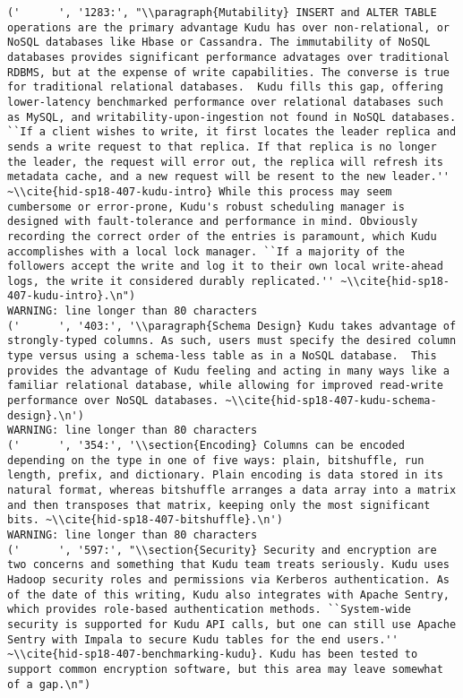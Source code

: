 \begin{tiny}
\begin{verbatim}
('      ', '1283:', "\\paragraph{Mutability} INSERT and ALTER TABLE operations are the primary advantage Kudu has over non-relational, or NoSQL databases like Hbase or Cassandra. The immutability of NoSQL databases provides significant performance advatages over traditional RDBMS, but at the expense of write capabilities. The converse is true for traditional relational databases.  Kudu fills this gap, offering lower-latency benchmarked performance over relational databases such as MySQL, and writability-upon-ingestion not found in NoSQL databases. ``If a client wishes to write, it first locates the leader replica and sends a write request to that replica. If that replica is no longer the leader, the request will error out, the replica will refresh its metadata cache, and a new request will be resent to the new leader.'' ~\\cite{hid-sp18-407-kudu-intro} While this process may seem cumbersome or error-prone, Kudu's robust scheduling manager is designed with fault-tolerance and performance in mind. Obviously recording the correct order of the entries is paramount, which Kudu accomplishes with a local lock manager. ``If a majority of the followers accept the write and log it to their own local write-ahead logs, the write it considered durably replicated.'' ~\\cite{hid-sp18-407-kudu-intro}.\n")
WARNING: line longer than 80 characters
('      ', '403:', '\\paragraph{Schema Design} Kudu takes advantage of strongly-typed columns. As such, users must specify the desired column type versus using a schema-less table as in a NoSQL database.  This provides the advantage of Kudu feeling and acting in many ways like a familiar relational database, while allowing for improved read-write performance over NoSQL databases. ~\\cite{hid-sp18-407-kudu-schema-design}.\n')
WARNING: line longer than 80 characters
('      ', '354:', '\\section{Encoding} Columns can be encoded depending on the type in one of five ways: plain, bitshuffle, run length, prefix, and dictionary. Plain encoding is data stored in its natural format, whereas bitshuffle arranges a data array into a matrix and then transposes that matrix, keeping only the most significant bits. ~\\cite{hid-sp18-407-bitshuffle}.\n')
WARNING: line longer than 80 characters
('      ', '597:', "\\section{Security} Security and encryption are two concerns and something that Kudu team treats seriously. Kudu uses Hadoop security roles and permissions via Kerberos authentication. As of the date of this writing, Kudu also integrates with Apache Sentry, which provides role-based authentication methods. ``System-wide security is supported for Kudu API calls, but one can still use Apache Sentry with Impala to secure Kudu tables for the end users.'' ~\\cite{hid-sp18-407-benchmarking-kudu}. Kudu has been tested to support common encryption software, but this area may leave somewhat of a gap.\n")

\end{verbatim}
\end{tiny}
